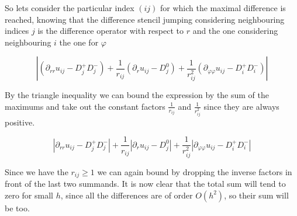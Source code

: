 So lets consider the particular index $(ij)$ for which the maximal difference is reached, knowing that the difference stencil jumping considering neighbouring indices $j$ is the difference operator with respect to $r$ and the one considering neighbouring $i$ the one for $\varphi$

\begin{equation*}
    |(\partial_{rr}u_{ij}-D^{+}_jD^{-}_j)
    +\frac{1}{r_{ij}}(\partial_{r}u_{ij}-D^{0}_j)
    +\frac{1}{r_{ij}^2}(\partial_{\varphi\varphi}u_{ij}-D^{+}_iD^{-}_i)|
\end{equation*}

By the triangle inequality we can bound the expression by the sum of the maximums and take out the constant factors $\frac{1}{r_{ij}}$ and $\frac{1}{r_{ij}^2}$ since they are always positive.

\begin{equation*}
    |\partial_{rr}u_{ij}-D^{+}_jD^{-}_j|
    +\frac{1}{r_{ij}}|\partial_{r}u_{ij}-D^{0}_j|
    +\frac{1}{r_{ij}^2}|\partial_{\varphi\varphi}u_{ij}-D^{+}_iD^{-}_i|
\end{equation*}

Since we have the $r_{ij}\geq 1$ we can again bound by dropping the inverse factors in front of the last two summands. It is now clear that the total sum will tend to zero for small $h$, since all the differences are of order $O(h^2)$, so their sum will be too.

%
